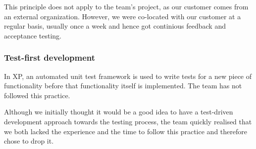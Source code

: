 This principle does not apply to the team's project, as our customer comes from an external organization. However, we were co-located with our customer at a regular basis, usually once a week and hence got continious feedback and acceptance testing.

\subsubsection{Test-first development}
In XP, an automated unit test framework is used to write tests for a new piece of functionality before that functionality itself is implemented. The team has not followed this practice.

Although we initially thought it would be a good idea to have a test-driven development approach towards the testing process, the team quickly realised that we both lacked the experience and the time to follow this practice and therefore chose to drop it.